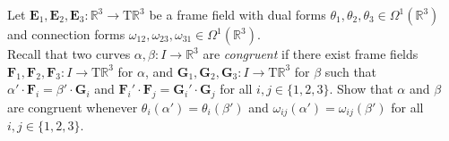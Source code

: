 \documentclass[12 pt, letterpaper]{hmcpset}
\begin{document}
\begin{problem}[Problem 2.]
	Let $\mathbf{E}_{1}, \mathbf{E}_{2}, \mathbf{E}_{3} : \mathbb{R}^{3} \to \mathrm{T} \mathbb{R}^{3}$ be a frame field with dual forms $\theta_{1}, \theta_2, \theta_{3} \in \Omega^{1}(\mathbb{R}^{3})$ and connection forms $\omega_{12}, \omega_{23}, \omega_{31} \in \Omega^{1}(\mathbb{R}^{3})$. \\

	Recall that two curves $\alpha, \beta : I \to \mathbb{R}^{3}$ are \textit{congruent} if there exist frame fields $\mathbf{F}_{1}, \mathbf{F}_{2}, \mathbf{F}_{3} : I \to \mathrm{T}\mathbb{R}^{3}$ for $\alpha$, and $\mathbf{G}_{1}, \mathbf{G}_{2}, \mathbf{G}_3 : I \to \mathrm{T} \mathbb{R}^{3}$ for $\beta$ such that $\alpha' \cdot \mathbf{F}_{i} = \beta' \cdot \mathbf{G}_{i}$ and $\mathbf{F}_{i}' \cdot \mathbf{F}_{j} = \mathbf{G}_{i}' \cdot \mathbf{G}_{j}$ for all $i, j \in \{ 1, 2, 3 \}$. Show that $\alpha$ and $\beta$ are congruent whenever $\theta_{i}(\alpha') = \theta_{i}(\beta')$ and $\omega_{ij}(\alpha') = \omega_{ij}(\beta')$ for all $i, j \in \{ 1, 2, 3 \}$.
\end{problem}
\end{document}
